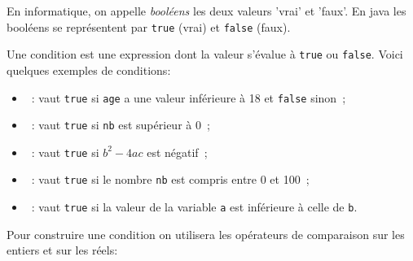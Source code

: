 \documentclass[a4paper,11pt]{article}
\begin{document}
	En informatique, on appelle \emph{booléens} les deux valeurs 'vrai' et 'faux'. 
	En java les booléens se représentent par \texttt{true} (vrai) et \texttt{false} (faux).  

	Une condition est une expression dont la valeur s'évalue à \texttt{true} ou \texttt{false}.
	Voici quelques exemples de conditions:
	\begin{itemize}
		\item {}~:  vaut \texttt{true} si \texttt{age} a une valeur inférieure à 18 et \texttt{false} sinon~;
		\item {}~:  vaut \texttt{true} si \texttt{nb} est supérieur à 0~;
		\item {}~: vaut \texttt{true} si $b^2-4ac$ est négatif~;
		\item {}~: vaut \texttt{true} si le nombre \texttt{nb} est compris entre 0 et 100~;
		\item {}~:  vaut \texttt{true} si la valeur de la variable \texttt{a} est inférieure à celle de \texttt{b}.
	\end{itemize}


	Pour construire une condition on utilisera les opérateurs de comparaison sur les entiers et sur les réels:
	
\end{document}
